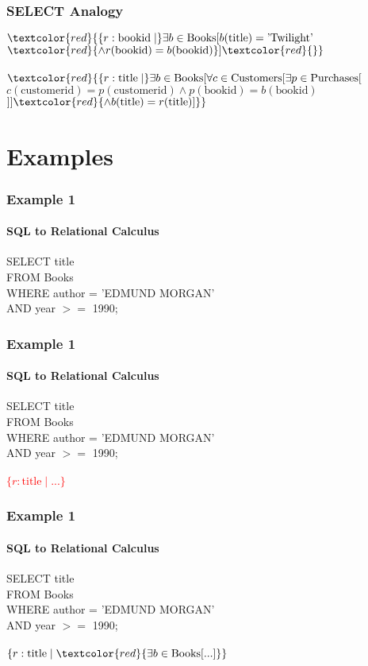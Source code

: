 \documentclass{beamer}
\begin{document}
\begin{frame}
  \frametitle{SELECT Analogy}
  $\textcolor{red}{\{r:\text{bookid} \mid }\exists b \in \text{Books} [b(\text{title}) = \text{'Twilight'}$ \\
  $\textcolor{red}{\land r(\text{bookid}) = b(\text{bookid})}]\textcolor{red}{\}}$\\
  \hfill \\
  $\textcolor{red}{\{ r:\text{title} \mid }\exists b \in \text{Books} [\forall c \in \text{Customers} [ \exists p \in \text{Purchases} [ $\\
  $c(\text{customerid}) = p(\text{customerid}) \land  p(\text{bookid}) = b(\text{bookid})$ \\
  $] ] \textcolor{red}{ \land b(\text{title}) = r(\text{title})]\}}$
\end{frame}

\section{Examples}

\begin{frame}
  \frametitle{Example 1}
    \framesubtitle{SQL to Relational Calculus}
  SELECT title\\
  FROM Books\\
  WHERE author = 'EDMUND MORGAN'\\
  AND year $>=$ 1990;\\
\end{frame}
\begin{frame}
  \frametitle{Example 1}
    \framesubtitle{SQL to Relational Calculus}
  SELECT title\\
  FROM Books\\
  WHERE author = 'EDMUND MORGAN'\\
  AND year $>=$ 1990;\\
  \hfill \\
  \textcolor{red}{$\{r:\text{title} \mid ... \}$}
\end{frame}

\begin{frame}
  \frametitle{Example 1}
    \framesubtitle{SQL to Relational Calculus}
  SELECT title\\
  FROM Books\\
  WHERE author = 'EDMUND MORGAN'\\
  AND year $>=$ 1990;\\
  \hfill \\
  $\{r:\text{title} \mid \textcolor{red}{\exists b \in \text{Books} [ ... ]} \}$
\end{frame}
\end{document}
